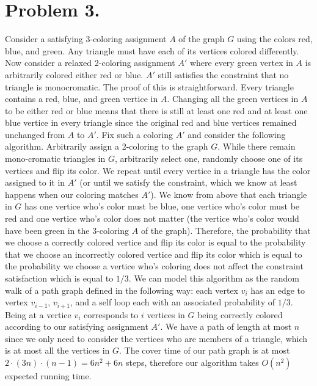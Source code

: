 \documentclass[12pt]{article}
\begin{document}
\pagestyle{plain}
\titleformat{\subsection}[runin]
  {\normalfont\large\bfseries}{\thesubsection}{1em}{}
\titleformat{\subsubsection}[runin]
  {\normalfont\large\bfseries}{\thesubsubsection}{1em}{}

\section*{Problem 3.}
Consider a satisfying 3-coloring assignment $A$ of the graph $G$ using the
colors red, blue, and green. Any triangle must have each of its vertices
colored differently. Now consider a relaxed 2-coloring assignment $A'$ where
every green vertex in $A$ is arbitrarily colored either red or blue. $A'$
still satisfies the constraint that no triangle is monocromatic. The proof of
this is straightforward. Every triangle contains a red, blue, and green vertice
in $A$. Changing all the green vertices in $A$ to be either red or blue means
that there is still at least one red and at least one blue vertice in every
triangle since the original red and blue vertices remained unchanged from $A$ to
$A'$. Fix such a coloring $A'$ and consider the following algorithm.
Arbitrarily assign a 2-coloring to the graph $G$. While there remain
mono-cromatic triangles in $G$, arbitrarily select one, randomly choose one of
its vertices and flip its color. We repeat until every vertice in a triangle has
the color assigned to it in $A'$ (or until we satisfy the constraint, which we
know at least happens when our coloring matches $A'$). We know from above that
each triangle in $G$ has one vertice who's color must be blue, one vertice who's
color must be red and one vertice who's color does not matter (the vertice who's
color would have been green in the 3-coloring $A$ of the graph). Therefore, the
probability that we choose a correctly colored vertice and flip its color is
equal to the probability that we choose an incorrectly colored vertice and flip
its color which is equal to the probability we choose a vertice who's coloring does
not affect the constraint satisfaction which is equal to $1/3$. We can model
this algorithm as the random walk of a path graph defined in the following way:
each vertex $v_i$ has an edge to vertex $v_{i-1}$, $v_{i+1}$, and a self loop
each with an associated probability of $1/3$. Being at a vertice $v_i$ corresponds
to $i$ vertices in $G$ being correctly colored according to our satisfying assignment $A'$.
We have a path of length at most $n$ since we only need to consider the vertices who are
members of a triangle, which is at most all the vertices in $G$. The cover time
of our path graph is at most $2\cdot(3n)\cdot(n-1) = 6n^2+6n$ steps, therefore
our algorithm takes $O(n^2)$ expected running time.
\end{document}
